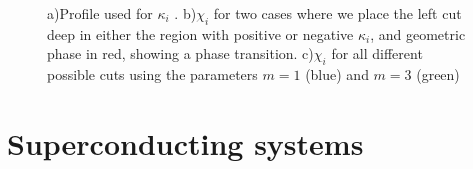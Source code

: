 \documentclass[prb,twocolumn,amsmath,amssymb,superscriptaddress]{revtex4-1}
\begin{document}
\begin{figure}[h!]
\centering
{}\hspace{0mm}



\caption{a)Profile used for $\kappa_i$ . b)$\chi_i$ for two cases where we place the left cut deep in either the region with positive or negative $\kappa_i$, and geometric phase in red, showing a phase transition. c)$\chi_i$ for all different possible cuts using the parameters $m=1$ (blue) and $m=3$ (green)}
\label{cuts}
\end{figure}

\section{Superconducting systems}
\end{document}
